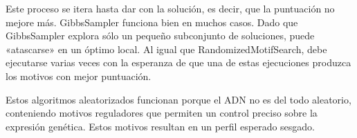Este proceso se itera hasta dar con la solución, es decir, que la puntuación no mejore más. 
GibbsSampler funciona bien en muchos casos. Dado que GibbsSampler explora sólo un pequeño subconjunto de soluciones, puede «atascarse» en un óptimo local. Al igual que RandomizedMotifSearch, debe ejecutarse varias veces con la esperanza de que una de estas ejecuciones produzca los motivos con mejor puntuación.

Estos algoritmos aleatorizados funcionan porque el ADN no es del todo aleatorio, conteniendo motivos reguladores que permiten un control preciso sobre la expresión genética. Estos motivos resultan en un perfil esperado sesgado.

